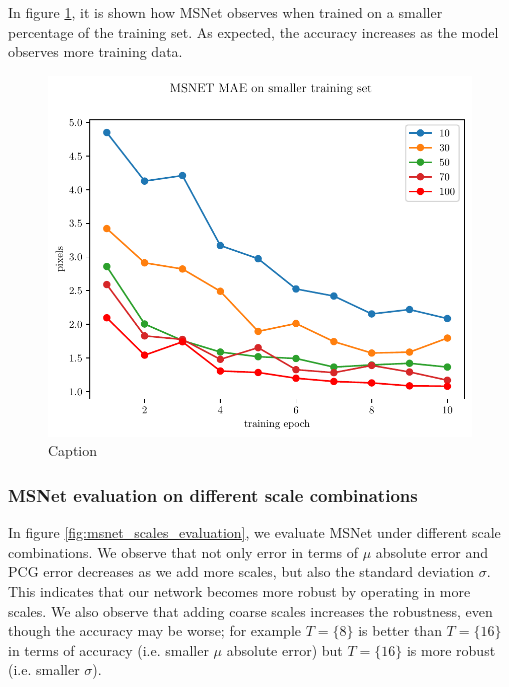 \documentclass[10pt]{article}
\begin{document}
In figure \ref{fig:msnet_smaller_tr_set}, it is shown how MSNet observes when trained on a smaller percentage of the training set. As expected, the accuracy increases as the model observes more training data.

\begin{figure}
    \centering
    \includegraphics[width=\textwidth]{paper/latex/figures/freiburg_msnet_mae_smaller_training_set.pdf}
    \caption{Caption}
    \label{fig:msnet_smaller_tr_set}
\end{figure}{}

\subsubsection{MSNet evaluation on different scale combinations}

In figure \ref{fig:msnet_scales_evaluation}, we evaluate MSNet under different scale combinations. We observe that not only error in terms of $\mu$ absolute error and PCG error decreases as we add more scales, but also the standard deviation $\sigma$. This indicates that our network becomes more robust by operating in more scales. We also observe that adding coarse scales increases the robustness, even though the accuracy may be worse; for example $T=\{ 8 \}$ is better than $ T = \{ 16 \}$ in terms of accuracy (i.e. smaller $\mu$ absolute error) but $ T = \{ 16 \}$ is more robust (i.e. smaller $\sigma$). 
\end{document}
